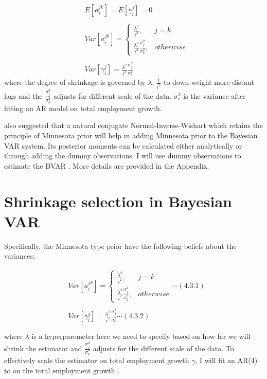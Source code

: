 \documentclass{monashthesis}
\begin{document}
\[
\begin{aligned}\label{eq:1}
&E[a_{i}^{jk}] = E[\gamma_{i}^j]=0\\
\\
&Var[a_i^{jk}]= 
\begin{cases}
\frac{\lambda^2}{i^2},&j=k\\
\frac{\lambda^2}{i^2}\frac{\sigma^2_{j}}{\sigma^2_k},& otherwise
\end{cases}\\
\\
&Var[\gamma_i^{j}]=\frac{\lambda^2}{i^2}\frac{\sigma^2_{j}}{\sigma^2_e}
\end{aligned}
\]
where the degree of shrinkage is governed by \(\lambda\), \(\frac{1}{i^2}\) to down-weight more distant lags and the \(\frac{\sigma_j^2}{\sigma_k^2}\) adjusts for different scale of the data. \(\sigma^2_e\) is the variance after fitting an AR model on total employment growth.

\textcite{banbura2010large} also suggested that a natural conjugate Normal-Inverse-Wishart which retains the principle of Minnesota prior will help in adding Minnesota prior to the Bayesian VAR system. Its posterior moments can be calculated either analytically or through adding the dummy observations. I will use dummy observations to estimate the BVAR \autocite{banbura2010large}. More details are provided in the Appendix.

\newpage

\hypertarget{shrinkage-selection-in-bayesian-var}{%
\section{Shrinkage selection in Bayesian VAR}\label{shrinkage-selection-in-bayesian-var}}

Specifically, the Minnesota type prior have the following beliefs about the variances:

\[
\begin{aligned}
&Var[a_i^{jk}]= 
\begin{cases}
\frac{\lambda^2}{i^2},&j=k\\
\frac{\lambda^2}{i^2}\frac{\sigma^2_{j}}{\sigma^2_k},& otherwise
\end{cases}\cdots(4.3.1)\\
\\
&Var[\gamma_i^{j}]=\frac{\lambda^2}{i^2}\frac{\sigma^2_{j}}{\sigma^2_e}\cdots(4.3.2)
\end{aligned}
\]

where \(\lambda\) is a hyperparemeter here we need to specify based on how far we will shrink the estimator and \(\frac{\sigma^2_{j}}{\sigma^2_k}\) adjusts for the different scale of the data. To effectively scale the estimator on total employment growth \(\gamma\), I will fit an AR(4) to on the total employment growth \autocite{anderson2020}.
\end{document}
